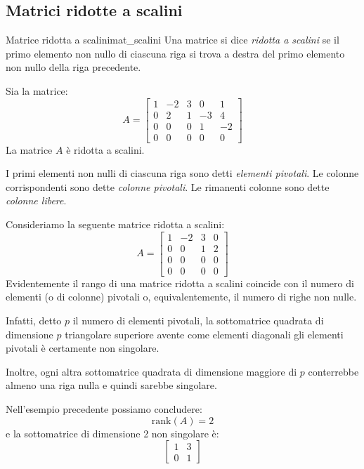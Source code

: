 \documentclass[12pt]{report}
\newcounter{definition}
\newcommand{\nmu}{}
\begin{document}
\subsection{Matrici ridotte a scalini}
\begin{definition}{\nmu Matrice ridotta a scalini}{mat_scalini}
Una matrice si dice \textit{ridotta a scalini} se il primo elemento non nullo di ciascuna riga si trova a destra del primo elemento non nullo della riga precedente.
\end{definition}
\begin{example}{}{}
Sia la matrice:
\[A = \begin{bmatrix}
	1 & -2 & 3 & 0 & 1 \\
	0 & 2 & 1 & -3 & 4\\
	0 & 0 & 0 & 1 & -2 \\
	0 & 0 & 0 & 0 & 0
\end{bmatrix}\]
La matrice $A$ è ridotta a scalini.
\end{example}
I primi elementi non nulli di ciascuna riga sono detti \textit{elementi pivotali}. Le colonne corrispondenti sono dette \textit{colonne pivotali}. Le rimanenti colonne sono dette \textit{colonne libere}.
\begin{note}{}{}
Consideriamo la seguente matrice ridotta a scalini:
\[
A = \begin{bmatrix}
	1 & -2 & 3 & 0 \\
	0 & 0 & 1 & 2 \\
	0 & 0 & 0 & 0 \\
	0 & 0 & 0 & 0
\end{bmatrix}
\]
Evidentemente il rango di una matrice ridotta a scalini coincide con il numero di elementi (o di colonne) pivotali o, equivalentemente, il numero di righe non nulle.

Infatti, detto $p$ il numero di elementi pivotali, la sottomatrice quadrata di dimensione $p$ triangolare superiore avente come elementi diagonali gli elementi pivotali è certamente non singolare.

Inoltre, ogni altra sottomatrice quadrata di dimensione maggiore di $p$ conterrebbe almeno una riga nulla e quindi sarebbe singolare.

Nell'esempio precedente possiamo concludere:
\[
\text{rank}(A) = 2
\]
e la sottomatrice di dimensione 2 non singolare è:
\[
\begin{bmatrix}
	1 & 3 \\
	0 & 1
\end{bmatrix}
\]
\end{note}
\end{document}
